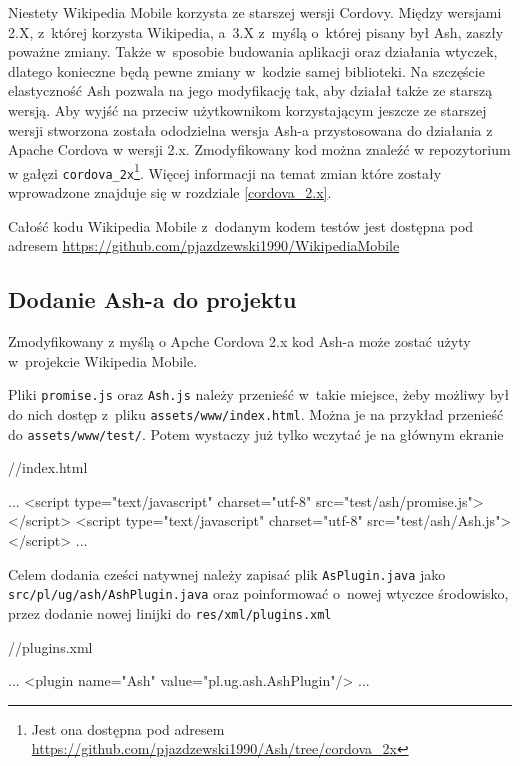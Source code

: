 \documentclass[brudnopis]{xmgr}
\begin{document}
Niestety Wikipedia Mobile korzysta ze starszej wersji Cordovy. Między wersjami 2.X, z~której korzysta Wikipedia, a~3.X z~myślą o~której pisany był Ash, zaszły poważne zmiany. Także w~sposobie budowania aplikacji oraz działania wtyczek, dlatego konieczne będą pewne zmiany w~kodzie samej biblioteki. Na szczęście elastyczność Ash pozwala na jego modyfikację tak, aby działał także ze starszą wersją. Aby wyjść na przeciw użytkownikom korzystającym jeszcze ze starszej wersji stworzona została ododzielna wersja Ash-a przystosowana do działania z Apache Cordova w wersji 2.x. Zmodyfikowany kod można znaleźć w repozytorium w gałęzi  \texttt{cordova\_2x}\footnote{Jest ona dostępna pod adresem \url{https://github.com/pjazdzewski1990/Ash/tree/cordova\_2x} }. Więcej informacji na temat zmian które zostały wprowadzone znajduje się w rozdziale \ref{cordova_2.x}. 

Całość kodu Wikipedia Mobile z~dodanym kodem testów jest dostępna pod adresem \url{https://github.com/pjazdzewski1990/WikipediaMobile} 

\subsection{Dodanie Ash-a do projektu}

Zmodyfikowany z myślą o Apche Cordova 2.x kod Ash-a może zostać użyty w~projekcie Wikipedia Mobile. 

Pliki \texttt{promise.js} oraz \texttt{Ash.js} należy przenieść w~takie miejsce, żeby możliwy był do nich dostęp z~pliku \texttt{assets/www/index.html}. Można je na przykład przenieść do \texttt{assets/www/test/}. Potem wystaczy już tylko wczytać je na głównym ekranie 

\begin{htmlcode}
   //index.html
  
  ...
  <script type="text/javascript" 
        charset="utf-8" src="test/ash/promise.js"></script>
  <script type="text/javascript" 
        charset="utf-8" src="test/ash/Ash.js"></script>
  ...

\end{htmlcode}

Celem dodania cześci natywnej należy zapisać plik \texttt{AsPlugin.java} jako \texttt{src/pl/ug/ash/AshPlugin.java} oraz poinformować o~nowej wtyczce środowisko, przez dodanie nowej linijki do \texttt{res/xml/plugins.xml}

\begin{htmlcode}
   //plugins.xml
  
  ...
  <plugin name="Ash" value="pl.ug.ash.AshPlugin"/>
  ...

\end{htmlcode}
\end{document}
